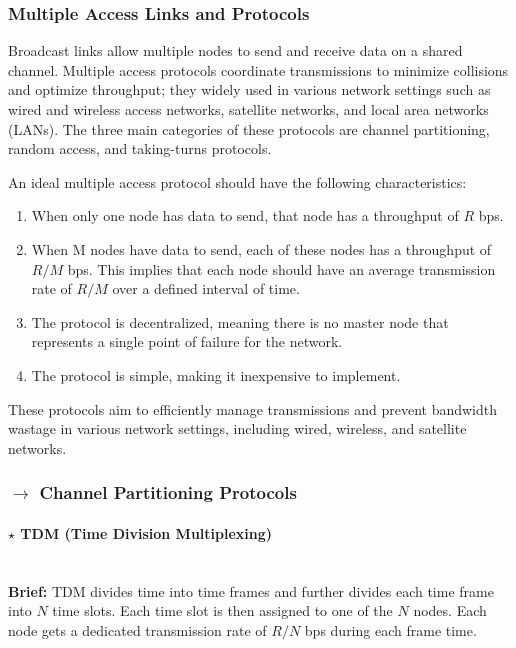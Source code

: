\subsubsection[5.3 Multiple Access Links and Protocols]{\hspace*{0.075 em}\raisebox{0.2 em}{$\pmb{\drsh}$} Multiple Access Links and Protocols}

Broadcast links allow multiple nodes to send and receive data on a shared channel. Multiple access protocols coordinate transmissions to minimize collisions and optimize throughput; they widely used in various network settings such as wired and wireless access networks, satellite networks, and local area networks (LANs).  The three main categories of these protocols are channel partitioning, random access, and taking-turns protocols.

\vspace{1em}
\noindent An ideal multiple access protocol should have the following characteristics:
\begin{enumerate}
    \item When only one node has data to send, that node has a throughput of $R$ bps.
    \item When M nodes have data to send, each of these nodes has a throughput of $R/M$ bps. This implies that each node should have an average transmission rate of $R/M$ over a defined interval of time.
    \item The protocol is decentralized, meaning there is no master node that represents a single point of failure for the network.
    \item The protocol is simple, making it inexpensive to implement.
\end{enumerate}

\noindent These protocols aim to efficiently manage transmissions and prevent bandwidth wastage in various network settings, including wired, wireless, and satellite networks.

\clearpage
\subsubsection[5.3.1 Channel Partitioning Protocols]{$\rightarrow$ Channel Partitioning Protocols}
\label{subsec:part-access-protocols}

\paragraph[5.3.1.1 TDM]{$\pmb{\star}$ TDM (Time Division Multiplexing)}\mbox{}\\[4pt]
\noindent \textbf{Brief:} TDM divides time into time frames and further
divides each time frame into $N$ time slots. Each time slot is then assigned to one of the $N$ nodes. Each node gets a dedicated transmission rate of $R/N$ bps during each frame time.

